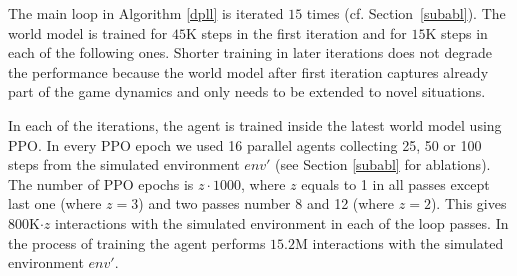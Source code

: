 The main loop in Algorithm \ref{dpll} is iterated $15$ times (cf. Section~\ref{subabl}). The world model is trained for $45$K steps in the first iteration and for $15$K steps in each of the following ones.  Shorter training in later iterations does not degrade the performance because the world model after first iteration captures already part of the game dynamics and only needs to be extended to novel situations.

In each of the iterations, the agent is trained inside the latest world model using PPO. In every PPO epoch we used 16 parallel agents collecting 25, 50 or 100 steps from the simulated environment $env'$ (see Section \ref{subabl} for ablations). The number of PPO epochs is $z\cdot 1000$, where $z$ equals to 1 in all passes except last one (where $z = 3$) and two passes number 8 and 12 (where $z = 2$). This gives $800$K$\cdot z$ interactions with the simulated environment in each of the loop passes. In the process of training the agent performs  $15.2$M interactions with the simulated environment $env'$.
